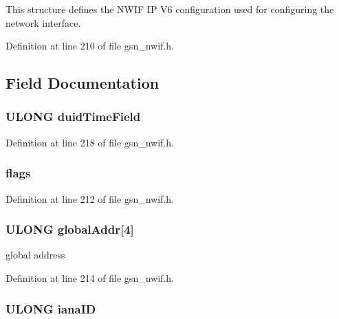 This structure defines the NWIF IP V6 configuration used for configuring the network interface. 

Definition at line 210 of file gsn\_\-nwif.h.



\subsection{Field Documentation}
\hypertarget{a00171_a2adbced60388bc8a9e953040c48a1af1}{
\subsubsection[{duidTimeField}]{\setlength{\rightskip}{0pt plus 5cm}ULONG {\bf duidTimeField}}}
\label{a00171_a2adbced60388bc8a9e953040c48a1af1}


Definition at line 218 of file gsn\_\-nwif.h.

\hypertarget{a00171_ac2108b3a7b612888050ddf7c6725d707}{
\subsubsection[{flags}]{ {\bf flags}}}
\label{a00171_ac2108b3a7b612888050ddf7c6725d707}


Definition at line 212 of file gsn\_\-nwif.h.

\hypertarget{a00171_abfafb3d633968d979d6d8e556f480943}{
\subsubsection[{globalAddr}]{\setlength{\rightskip}{0pt plus 5cm}ULONG {\bf globalAddr}\mbox{[}4\mbox{]}}}
\label{a00171_abfafb3d633968d979d6d8e556f480943}
global address 

Definition at line 214 of file gsn\_\-nwif.h.

\hypertarget{a00171_adbf55961e244d682c540f95f326e00a2}{
\subsubsection[{ianaID}]{\setlength{\rightskip}{0pt plus 5cm}ULONG {\bf ianaID}}}
\label{a00171_adbf55961e244d682c540f95f326e00a2}


